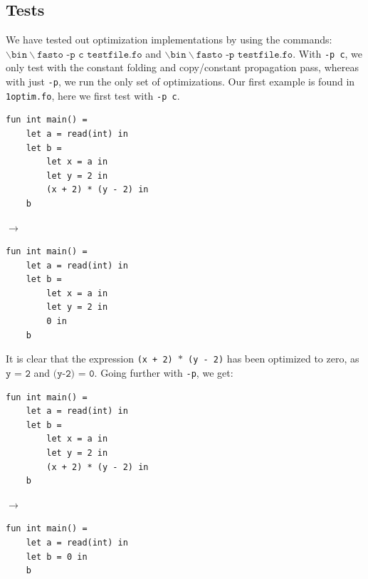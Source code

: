 \documentclass[11pt]{article}
\begin{document}
	\subsection{Tests}
	We have tested out optimization implementations by using the commands: \\
	$\backslash \texttt{bin}\backslash \texttt{fasto -p c testfile.fo}$ and
	$\backslash \texttt{bin}\backslash \texttt{fasto -p testfile.fo}$. With \texttt{-p c}, we only test with the constant folding and
	copy/constant propagation pass, whereas with just \texttt{-p}, we run the only set of optimizations. Our first example is found in \texttt{1optim.fo}, here we first test with \texttt{-p c}.\medskip\\
	\begin{center}
	\begin{minipage}{.5\textwidth}
	\begin{lstlisting}
fun int main() =
    let a = read(int) in
    let b =
        let x = a in
        let y = 2 in
        (x + 2) * (y - 2) in
    b
	\end{lstlisting}
	\end{minipage}%
	\begin{minipage}{.1\textwidth}
	$\rightarrow$
	\end{minipage}%
	\begin{minipage}{.4\textwidth}
	\begin{lstlisting}
fun int main() =
    let a = read(int) in
    let b =
        let x = a in
        let y = 2 in
        0 in
    b
	\end{lstlisting}
	\end{minipage}
	\end{center}
	It is clear that the expression \texttt{(x + 2) $\ast$ (y - 2)} has been optimized to zero, as $\texttt{y = 2}$
	and $\texttt{(y-2) = 0}$. Going further with \texttt{-p}, we get:
	\begin{center}
	\begin{minipage}{.5\textwidth}
	\begin{lstlisting}
fun int main() =
    let a = read(int) in
    let b =
        let x = a in
        let y = 2 in
        (x + 2) * (y - 2) in
    b

	\end{lstlisting}
	\end{minipage}%
	\begin{minipage}{.1\textwidth}
	$\rightarrow$
	\end{minipage}%
	\begin{minipage}{.4\textwidth}
	\begin{lstlisting}
fun int main() =
    let a = read(int) in
    let b = 0 in
    b
	\end{lstlisting}
	\end{minipage}
	\end{center}
\end{document}
